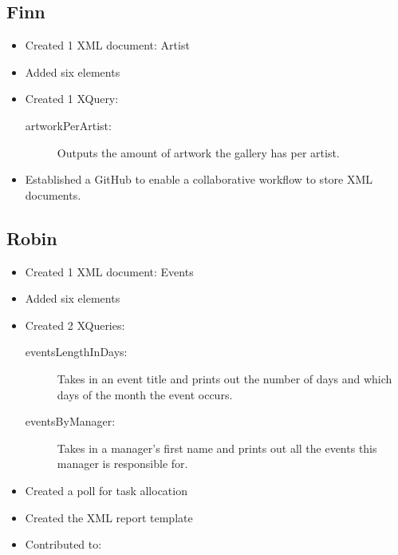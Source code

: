 \documentclass{article} %
\begin{document}
\subsection{Finn}
\begin{itemize}
    \item Created 1 XML document: Artist
    \item Added six elements
    \item Created 1 XQuery:
    \begin{description}
        \item [artworkPerArtist:] Outputs the amount of artwork the gallery has per artist.
    \end{description}
    \item Established a GitHub to enable a collaborative workflow to store XML documents.
\end{itemize}

\subsection{Robin}
\begin{itemize}
    \item Created 1 XML document: Events
    \item Added six elements 
    \item Created 2 XQueries:
    \begin{description}
        \item[eventsLengthInDays:] Takes in an event title and prints out the number of days and which days of the month the event occurs.
        \item[eventsByManager:] Takes in a manager's first name and prints out all the events this manager is responsible for.
    \end{description}
    \item Created a poll for task allocation
    \item Created the XML report template
    \item Contributed to:
\end{itemize}
\end{document}
